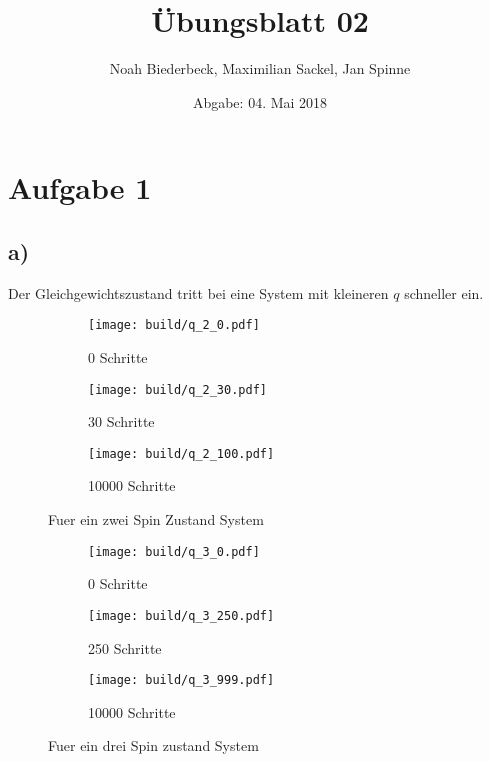 \documentclass{scrartcl}
\title{Übungsblatt 02}
\author{%
		Noah Biederbeck, Maximilian Sackel, Jan Spinne
}
\date{Abgabe: 04. Mai 2018}
\begin{document}
\maketitle

\section*{Aufgabe 1}
\subsection*{a)}

Der Gleichgewichtszustand tritt bei eine System mit kleineren $q$ schneller ein.
\begin{figure}[ht]
		\centering
		\begin{subfigure}[b]{0.3\textwidth}
				\begin{center}
						\texttt{[image: build/q\_2\_0.pdf]}
				\end{center}
				\caption{0 Schritte}
		\end{subfigure}
		\begin{subfigure}[b]{0.3\textwidth}
				\begin{center}
						\texttt{[image: build/q\_2\_30.pdf]}
				\end{center}
				\caption{30 Schritte}
		\end{subfigure}
		\begin{subfigure}[b]{0.3\textwidth}
				\begin{center}
						\texttt{[image: build/q\_2\_100.pdf]}
				\end{center}
				\caption{10000 Schritte}
		\end{subfigure}
		\caption{Fuer ein zwei Spin Zustand System}%
		\label{fig:1}
\end{figure}

\begin{figure}[ht]
		\centering
		\begin{subfigure}[b]{0.3\textwidth}
				\begin{center}
						\texttt{[image: build/q\_3\_0.pdf]}
				\end{center}
				\caption{0 Schritte}
		\end{subfigure}
		\begin{subfigure}[b]{0.3\textwidth}
				\begin{center}
						\texttt{[image: build/q\_3\_250.pdf]}
				\end{center}
				\caption{250 Schritte}
		\end{subfigure}
		\begin{subfigure}[b]{0.3\textwidth}
				\begin{center}
						\texttt{[image: build/q\_3\_999.pdf]}
				\end{center}
				\caption{10000 Schritte}
		\end{subfigure}
		\caption{Fuer ein drei Spin zustand System}%
		\label{fig:1}
\end{figure}
\end{document}

